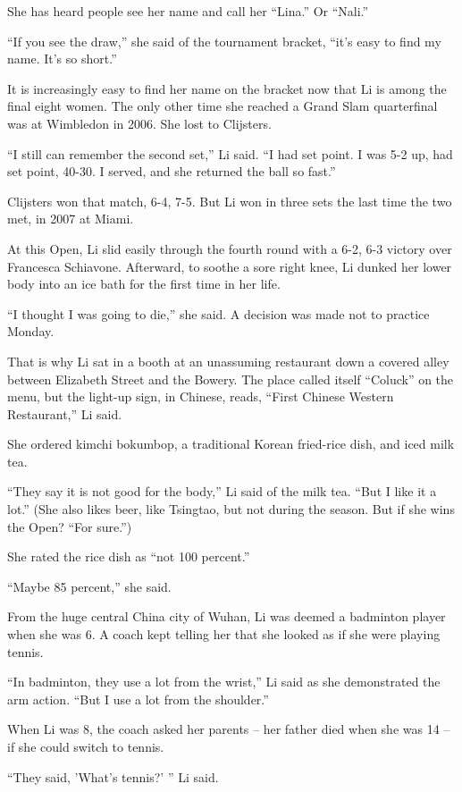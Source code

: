 ﻿\documentclass[12pt]{article}
\begin{document}
She has heard people see her name and call her ``Lina.'' Or ``Nali.''

``If you see the draw,'' she said of the tournament bracket, ``it's easy to find my name. It's so
short.''

It is increasingly easy to find her name on the bracket now that Li is among the final eight women.
The only other time she reached a Grand Slam quarterfinal was at Wimbledon in 2006. She lost to
Clijsters.

``I still can remember the second set,'' Li said. ``I had set point. I was 5-2 up, had set point,
40-30. I served, and she returned the ball so fast.''

Clijsters won that match, 6-4, 7-5. But Li won in three sets the last time the two met, in 2007 at
Miami.

At this Open, Li slid easily through the fourth round with a 6-2, 6-3 victory over Francesca
Schiavone. Afterward, to soothe a sore right knee, Li dunked her lower body into an ice bath for the
first time in her life.

``I thought I was going to die,'' she said. A decision was made not to practice Monday.

That is why Li sat in a booth at an unassuming restaurant down a covered alley between Elizabeth
Street and the Bowery. The place called itself ``Coluck'' on the menu, but the light-up sign, in
Chinese, reads, ``First Chinese Western Restaurant,'' Li said.

She ordered kimchi bokumbop, a traditional Korean fried-rice dish, and iced milk tea.

``They say it is not good for the body,'' Li said of the milk tea. ``But I like it a lot.'' (She
also likes beer, like Tsingtao, but not during the season. But if she wins the Open? ``For sure.'')

She rated the rice dish as ``not 100 percent.''

``Maybe 85 percent,'' she said.

From the huge central China city of Wuhan, Li was deemed a badminton player when she was 6. A coach
kept telling her that she looked as if she were playing tennis.

``In badminton, they use a lot from the wrist,'' Li said as she demonstrated the arm action. ``But I
use a lot from the shoulder.''

When Li was 8, the coach asked her parents -- her father died when she was 14 -- if she could switch
to tennis.

``They said, 'What's tennis?' '' Li said.
\end{document}

